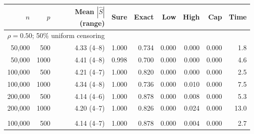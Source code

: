 \begin{tabular}{rrrrrrrrr}
\toprule
\(n\) & \(p\) & Mean \(|\widehat S|\) (range) & Sure & Exact & Low & High & Cap & Time\\
\midrule
\multicolumn{9}{l}{\(\rho=0.50\); 50\% uniform censoring}\\
50,000 & 500 & 4.33 (4--8) & 1.000 & 0.734 & 0.000 & 0.000 & 0.000 & 1.8\\
50,000 & 1000 & 4.41 (4--8) & 0.998 & 0.700 & 0.000 & 0.000 & 0.000 & 4.6\\
100,000 & 500 & 4.21 (4--7) & 1.000 & 0.820 & 0.000 & 0.000 & 0.000 & 2.5\\
100,000 & 1000 & 4.34 (4--8) & 1.000 & 0.736 & 0.000 & 0.010 & 0.000 & 7.5\\
200,000 & 500 & 4.14 (4--6) & 1.000 & 0.878 & 0.000 & 0.008 & 0.000 & 5.3\\
200,000 & 1000 & 4.20 (4--7) & 1.000 & 0.826 & 0.000 & 0.024 & 0.000 & 13.0\\
\addlinespace
\multicolumn{9}{l}{\(\rho=0.75\); 50\% covariate-dependent censoring}\\
100,000 & 500 & 4.14 (4--7) & 1.000 & 0.878 & 0.000 & 0.004 & 0.000 & 2.7\\
\bottomrule
\end{tabular}
